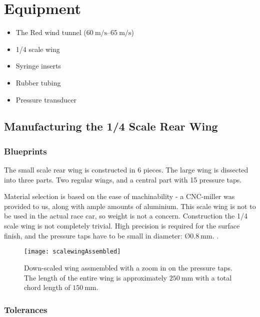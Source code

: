\section{Equipment}

  \begin{itemize}
    \item The Red wind tunnel ($\SIrange{60}{65}{\metre\per\second}$)
    \item 1/4 scale wing
    \item Syringe inserts
    \item Rubber tubing
    \item Pressure transducer
  \end{itemize}

  \subsection{Manufacturing the 1/4 Scale Rear Wing}

    \subsubsection{Blueprints}

      The small scale rear wing is constructed in 6 pieces. The large wing is dissected into three parts. Two regular wings, and a central part with 15 pressure taps.

      Material selection is based on the ease of machinability - a CNC-miller was provided to us, along with ample amounts of aluminium. This scale wing is not to be used in the actual race car, so weight is not a concern. Construction the 1/4 scale wing is not completely trivial. High precision is required for the surface finish, and the pressure taps have to be small in diameter: $Ø\SI{0.8}{\milli\metre}$. . 

      \begin{figure}
        \texttt{[image: scalewingAssembled]}
        \caption{Down-scaled wing assmembled with a zoom in on the pressure taps. The length of the entire wing is approximately $\SI{250}{\milli\metre}$ with a total chord length of $\SI{150}{\milli\metre}$.}
        \label{fig:scalewing}
      \end{figure}

    \subsubsection{Tolerances}

